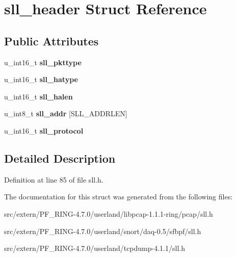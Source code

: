 \hypertarget{structsll__header}{
\section{sll\_\-header Struct Reference}
\label{structsll__header}
}
\subsection*{Public Attributes}
\begin{DoxyCompactItemize}
\item 
\hypertarget{structsll__header_a94baf3f5df00018216f4b06d29cb474b}{
u\_\-int16\_\-t {\bfseries sll\_\-pkttype}}
\label{structsll__header_a94baf3f5df00018216f4b06d29cb474b}

\item 
\hypertarget{structsll__header_ac13a6da5029afb275553dde06f5f4e2c}{
u\_\-int16\_\-t {\bfseries sll\_\-hatype}}
\label{structsll__header_ac13a6da5029afb275553dde06f5f4e2c}

\item 
\hypertarget{structsll__header_a531c98f876723644ee2d3e70a56a5801}{
u\_\-int16\_\-t {\bfseries sll\_\-halen}}
\label{structsll__header_a531c98f876723644ee2d3e70a56a5801}

\item 
\hypertarget{structsll__header_ada1f8bb19fe50751b56e3fe4981637c8}{
u\_\-int8\_\-t {\bfseries sll\_\-addr} \mbox{[}SLL\_\-ADDRLEN\mbox{]}}
\label{structsll__header_ada1f8bb19fe50751b56e3fe4981637c8}

\item 
\hypertarget{structsll__header_a31d56d1583a706f1ff983ac4a0e93c84}{
u\_\-int16\_\-t {\bfseries sll\_\-protocol}}
\label{structsll__header_a31d56d1583a706f1ff983ac4a0e93c84}

\end{DoxyCompactItemize}


\subsection{Detailed Description}


Definition at line 85 of file sll.h.



The documentation for this struct was generated from the following files:\begin{DoxyCompactItemize}
\item 
src/extern/PF\_\-RING-\/4.7.0/userland/libpcap-\/1.1.1-\/ring/pcap/sll.h\item 
src/extern/PF\_\-RING-\/4.7.0/userland/snort/daq-\/0.5/sfbpf/sll.h\item 
src/extern/PF\_\-RING-\/4.7.0/userland/tcpdump-\/4.1.1/sll.h\end{DoxyCompactItemize}
